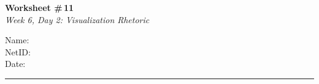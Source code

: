 \documentclass[11pt]{article}
\begin{document}
\noindent
\begin{minipage}[t]{0.55\textwidth}
  \vspace{0pt}
  {\LARGE \textbf{Worksheet \#\,11}} \\[0.3em]
  {\large \textit{Week 6, Day 2: Visualization Rhetoric}}
\end{minipage}
\hfill
\begin{minipage}[t]{0.40\textwidth}
  \vspace{0pt}
  \begin{mdframed}[linecolor=black, linewidth=1pt, innertopmargin=10pt, innerbottommargin=10pt]
    \small
    \vspace{0.4cm}
    Name: \underline{\hspace{4.5cm}} \\[1em]
    NetID: \underline{\hspace{4.3cm}} \\[1em]
    Date: \underline{\hspace{4.4cm}} \\
  \end{mdframed}
\end{minipage}

\vspace{1em}
\noindent\rule{\linewidth}{1pt}
\vspace{0.2em}
\end{document}
